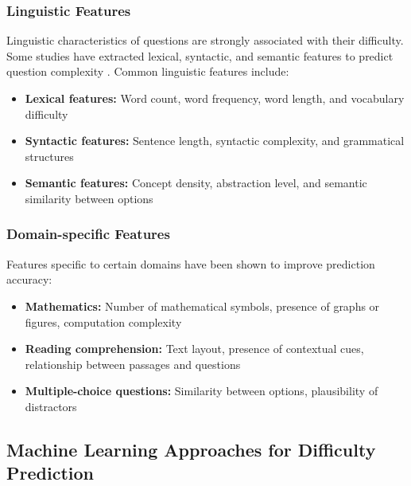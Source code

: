 \documentclass[11pt]{article}
\begin{document}
\subsubsection{Linguistic Features}

Linguistic characteristics of questions are strongly associated with their difficulty. Some studies have extracted lexical, syntactic, and semantic features to predict question complexity \citep{alkhuzaey2023text, choi2020predicting}. Common linguistic features include:

\begin{itemize}
    \item \textbf{Lexical features:} Word count, word frequency, word length, and vocabulary difficulty \citep{yaneva2019predicting, benedetto2020framework}
    \item \textbf{Syntactic features:} Sentence length, syntactic complexity, and grammatical structures \citep{choi2020predicting}
    \item \textbf{Semantic features:} Concept density, abstraction level, and semantic similarity between options \citep{bulut2023evaluating}
\end{itemize}

\subsubsection{Domain-specific Features}

Features specific to certain domains have been shown to improve prediction accuracy:

\begin{itemize}
    \item \textbf{Mathematics:} Number of mathematical symbols, presence of graphs or figures, computation complexity \citep{benedetto2020r2de}
    \item \textbf{Reading comprehension:} Text layout, presence of contextual cues, relationship between passages and questions \citep{lawrence2022reading}
    \item \textbf{Multiple-choice questions:} Similarity between options, plausibility of distractors \citep{kurdi2016experimental, yaneva2018automatic}
\end{itemize}

\subsection{Machine Learning Approaches for Difficulty Prediction}
\end{document}

